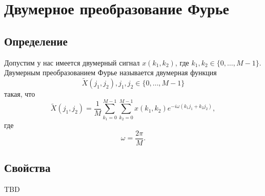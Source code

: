 \section{Двумерное преобразование Фурье}
\subsection{Определение}

\begin{definition}
Допустим у нас имеется двумерный сигнал $x\left(k_1, k_2\right)$, где 
$k_1,k_2 \in \{0, \dots, M - 1\}$. Двумерным преобразованием Фурье
называется двумерная функция 
\[
\tilde{X}\left(j_1, j_2\right), j_1,j_2
\in \{0, \dots, M - 1\}
\]
такая, что
\[
\tilde{X}\left(j_1, j_2\right) = 
\frac{1}{M}\sum_{k_1 = 0}^{M-1}\sum_{k_2 = 0}^{M-1}
x\left(k_1, k_2\right)e^{-i \omega\left(k_1 j_1 + k_2 j_2\right)},
\]
где
\[
\omega = \frac{2 \pi}{M}.
\]
\label{def:add:dsp:fourier2d}
\end{definition}

\subsection{Свойства}

TBD

